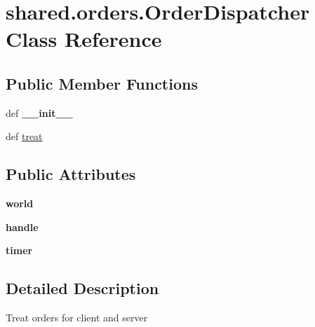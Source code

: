 \hypertarget{classshared_1_1orders_1_1_order_dispatcher}{\section{shared.\-orders.\-Order\-Dispatcher \-Class \-Reference}
\label{classshared_1_1orders_1_1_order_dispatcher}
}
\subsection*{\-Public \-Member \-Functions}
\begin{DoxyCompactItemize}
\item 
\hypertarget{classshared_1_1orders_1_1_order_dispatcher_aa96ea392f2eac7ecf7da6d5887592898}{def {\bfseries \-\_\-\-\_\-init\-\_\-\-\_\-}}\label{classshared_1_1orders_1_1_order_dispatcher_aa96ea392f2eac7ecf7da6d5887592898}

\item 
def \hyperlink{classshared_1_1orders_1_1_order_dispatcher_ae103895591d46096e3b7c41191995950}{treat}
\end{DoxyCompactItemize}
\subsection*{\-Public \-Attributes}
\begin{DoxyCompactItemize}
\item 
\hypertarget{classshared_1_1orders_1_1_order_dispatcher_ab5f1740af891b49ad598f5f46e11838b}{{\bfseries world}}\label{classshared_1_1orders_1_1_order_dispatcher_ab5f1740af891b49ad598f5f46e11838b}

\item 
\hypertarget{classshared_1_1orders_1_1_order_dispatcher_ab85c2803d6ddbaac6189065951c779d0}{{\bfseries handle}}\label{classshared_1_1orders_1_1_order_dispatcher_ab85c2803d6ddbaac6189065951c779d0}

\item 
\hypertarget{classshared_1_1orders_1_1_order_dispatcher_a99c0368a2194e26ee5c45f84d60988ec}{{\bfseries timer}}\label{classshared_1_1orders_1_1_order_dispatcher_a99c0368a2194e26ee5c45f84d60988ec}

\end{DoxyCompactItemize}


\subsection{\-Detailed \-Description}
\begin{DoxyVerb}Treat orders for client and server \end{DoxyVerb}
 

